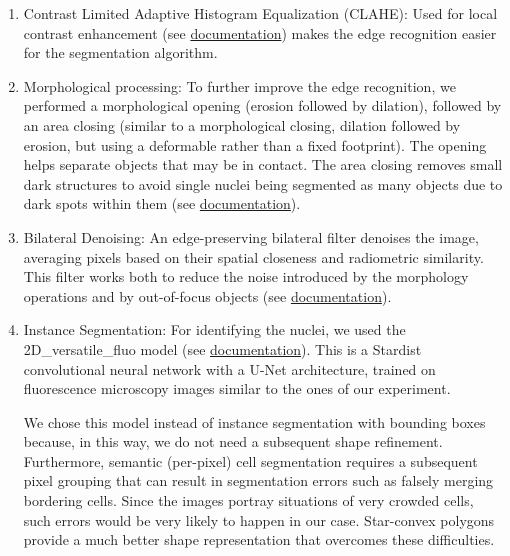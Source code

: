 \documentclass[fleqn,10pt]{wlscirep}
\begin{document}
\begin{enumerate}
    \item Contrast Limited Adaptive Histogram Equalization (CLAHE): Used for local contrast enhancement (see \href{https://scikit-image.org/docs/stable/api/skimage.exposure.html#skimage.exposure.equalize_adapthist}{documentation}) makes the edge recognition easier for the segmentation algorithm.
    
    \item Morphological processing: To further improve the edge recognition, we performed a morphological opening (erosion followed by dilation), followed by an area closing (similar to a morphological closing, dilation followed by erosion, but using a deformable rather than a fixed footprint). The opening helps separate objects that may be in contact. The area closing removes small dark structures to avoid single nuclei being segmented as many objects due to dark spots within them (see \href{https://scikit-image.org/docs/stable/api/skimage.morphology.html#skimage.morphology.area_closing}{documentation}).
    
    \item Bilateral Denoising: An edge-preserving bilateral filter denoises the image, averaging pixels based on their spatial closeness and radiometric similarity. This filter works both to reduce the noise introduced by the morphology operations and by out-of-focus objects (see \href{https://scikit-image.org/docs/stable/api/skimage.restoration.html#skimage.restoration.denoise_bilateral}{ documentation}).
    
    \item Instance Segmentation: For identifying the nuclei, we used the \textsf{2D\_versatile\_fluo} model (see \href{https://github.com/stardist/stardist}{documentation}). This is a \textsf{Stardist} \cite{schmidt2018} convolutional neural network with a U-Net architecture, trained on fluorescence microscopy images similar to the ones of our experiment. 
    
    We chose this model instead of instance segmentation with bounding boxes because, in this way, we do not need a subsequent shape refinement. Furthermore, semantic (per-pixel) cell segmentation requires a subsequent pixel grouping that can result in segmentation errors such as falsely merging bordering cells. Since the images portray situations of very crowded cells,  such errors would be very likely to happen in our case. Star-convex polygons provide a much better shape representation that overcomes these difficulties.
\end{enumerate}
\end{document}
